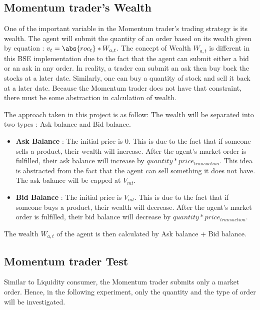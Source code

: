 \subsection{Momentum trader's Wealth}
One of the important variable in the Momentum trader's trading strategy is its wealth. The agent will submit the quantity of an order based on its wealth given by equation : $v_t = \abs{roc_t} * W_{a,t}$. The concept of Wealth $W_{a,t}$ is different in this BSE implementation due to the fact that the agent can submit either a bid or an ask in any order. In reality, a trader can submit an ask then buy back the stocks at a later date. Similarly, one can buy a quantity of stock and sell it back at a later date. Because the Momentum trader does not have that constraint, there must be some abstraction in calculation of wealth. 

The approach taken in this project is as follow: The wealth will be separated into two types : Ask balance and Bid balance. 

\begin{itemize}
  \item \textbf{Ask Balance} : The initial price is 0. This is due to the fact that if someone sells a product, their wealth will increase. After the agent's market order is fulfilled, their ask balance will increase by $quantity * price_{transaction}$. This idea is abstracted from the fact that the agent can sell something it does not have. The ask balance will be capped at $V_{mt}$. 
  \item \textbf{Bid Balance} : The initial price is $V_{mt}$. This is due to the fact that if someone buys a product, their wealth will decrease. After the agent's market order is fulfilled, their bid balance will decrease by $quantity * price_{transaction}$.
\end{itemize}

The wealth $W_{a,t}$ of the agent is then calculated by Ask balance + Bid balance. 

\subsection{Momentum trader Test} 
Similar to Liquidity consumer, the Momentum trader submits only a market order. Hence, in the following experiment, only the quantity and the type of order will be investigated.  

